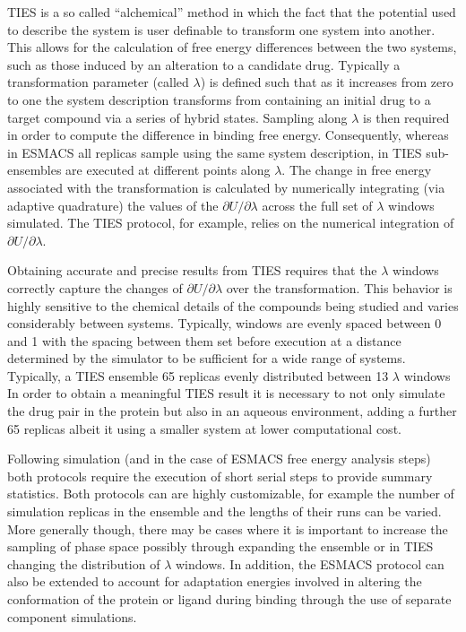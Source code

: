 TIES is a so called ``alchemical'' method in which the fact that the potential 
used to describe the system is user definable to transform one system into 
another. This allows for the calculation of free energy differences between 
the two systems, such as those induced by an alteration to a candidate drug.
Typically a transformation parameter (called $\lambda$) is defined such 
that as it increases from zero to one the system description transforms from 
containing an initial drug to a target compound via a series of hybrid states.
Sampling along $\lambda$ is then required in order to compute the difference 
in binding free energy. Consequently, whereas in ESMACS all replicas sample 
using the same system description, in TIES sub-ensembles are executed at 
different points along $\lambda$. The change in free energy associated 
with the transformation is calculated by numerically integrating 
(via adaptive quadrature) the values of the $\partial U/\partial\lambda$ 
across the full set of $\lambda$ windows simulated. The TIES protocol, 
for example, relies on the numerical integration of $\partial U/\partial\lambda$. 

Obtaining accurate and precise results from TIES requires that the $\lambda$ 
windows correctly capture the changes of $\partial U/\partial\lambda$ over 
the transformation. This behavior is highly sensitive to
the chemical details of the compounds being studied and varies considerably 
between systems. Typically, windows are evenly spaced between 0 and 1 with 
the spacing between them set before execution at a distance determined by the 
simulator to be sufficient for a wide range of systems. Typically, a TIES 
ensemble 65 replicas evenly distributed between 13 $\lambda$ windows
In order to obtain a meaningful TIES result it is necessary to not only 
simulate the drug pair in the protein but also in an aqueous environment, 
adding a further 65 replicas albeit it using a smaller system at lower 
computational cost.


Following simulation (and in the case of ESMACS free energy analysis steps) 
both protocols require the execution of short serial steps to provide summary 
statistics. Both protocols can are highly customizable, for example the number 
of simulation replicas in the ensemble and the lengths of their runs can be 
varied. More generally though, there may be cases where it is important to 
increase the sampling of phase space possibly through expanding the ensemble 
or in TIES changing the distribution of $\lambda$ windows.
In addition, the ESMACS protocol can also be extended to account for 
adaptation energies involved in altering the conformation of the protein 
or ligand during binding through the use of separate component simulations.


